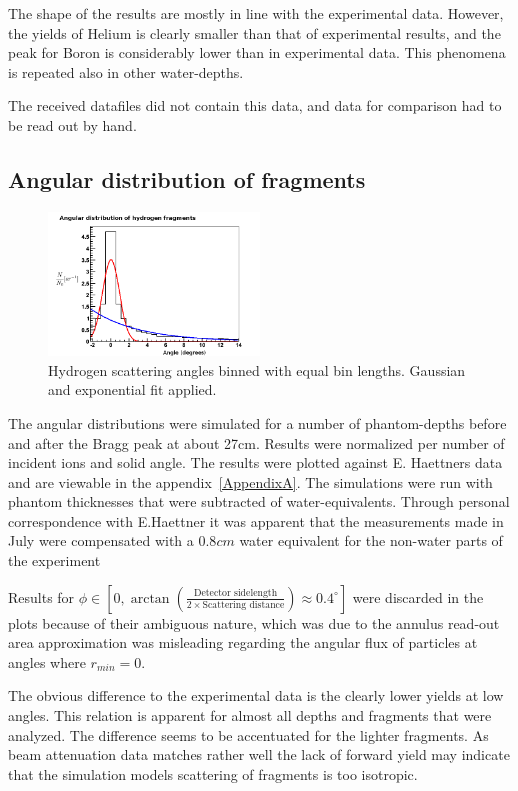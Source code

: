 The shape of the results are mostly in line with the experimental data. However, the yields of Helium is clearly smaller than that of experimental results, and the peak for Boron is considerably lower than in experimental data. This phenomena is repeated also in other water-depths.

The received datafiles did not contain this data, and data for comparison had to be read out by hand.

\subsection{Angular distribution of fragments}
\begin{figure}[!h] 
\begin{center}
\includegraphics[width=0.5\textwidth]{images/plots/angularDistributions/equlBinnedHydrogen279.png}  
\caption{\label{fig:binnedHydrogen} Hydrogen scattering angles binned with equal bin lengths. Gaussian and exponential fit applied.}
 \end{center}
 \end{figure}
The angular distributions were simulated for a number of phantom-depths before and after the Bragg peak at about 27cm. Results were normalized per number of incident ions and solid angle. The results were plotted against E. Haettners data and are viewable in the appendix~\ref{AppendixA}. The simulations were run with phantom thicknesses that were subtracted of water-equivalents. Through personal correspondence with E.Haettner it was apparent that the measurements made in July were compensated with a $0.8 cm$ water equivalent for the non-water parts of the experiment

Results for $\phi \in [0,\arctan(\frac{\text{Detector sidelength}}{2 \times \text{Scattering distance}}) \approx 0.4^{\circ}]$ were discarded in the plots because of their ambiguous nature, which was due to the annulus read-out area approximation was misleading regarding the angular flux of particles at angles where $r_{min} = 0$.

The obvious difference to the experimental data is the clearly lower yields at low angles. This relation is apparent for almost all depths and fragments that were analyzed. The difference seems to be accentuated for the lighter fragments. As beam attenuation data matches rather well the lack of forward yield may indicate that the simulation models scattering of fragments is too isotropic.

